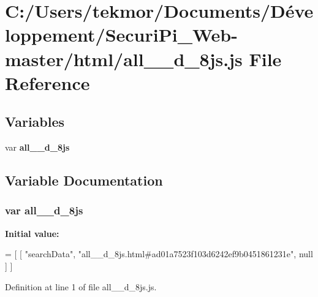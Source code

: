 \section{C\+:/\+Users/tekmor/\+Documents/\+Développement/\+Securi\+Pi\+\_\+\+Web-\/master/html/all\+\_\+\+\_\+d\+\_\+8js.js File Reference}
\label{all____d__8js_8js}
\subsection*{Variables}
\begin{DoxyCompactItemize}
\item 
var {\bf all\+\_\+\+\_\+d\+\_\+8js}
\end{DoxyCompactItemize}


\subsection{Variable Documentation}
\subsubsection[{all\+\_\+\+\_\+d\+\_\+8js}]{\setlength{\rightskip}{0pt plus 5cm}var all\+\_\+\+\_\+d\+\_\+8js}\label{all____d__8js_8js_a865c1b439cef121e1a411a7a97be0e7b}
{\bfseries Initial value\+:}
\begin{DoxyCode}
=
[
    [ \textcolor{stringliteral}{"searchData"}, \textcolor{stringliteral}{"all\_\_d\_8js.html#ad01a7523f103d6242ef9b0451861231e"}, null ]
]
\end{DoxyCode}


Definition at line 1 of file all\+\_\+\+\_\+d\+\_\+8js.\+js.

